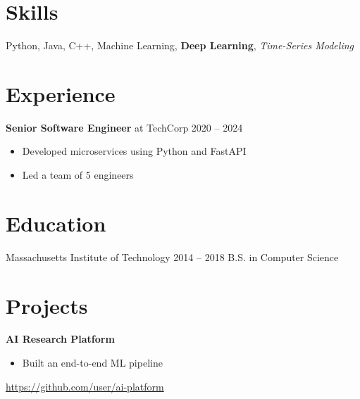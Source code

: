 \documentclass{article}
\begin{document}
\section{Skills}
Python, Java, C++, Machine Learning, \textbf{Deep Learning}, \textit{Time-Series Modeling}

\section{Experience}
\textbf{Senior Software Engineer} at TechCorp
2020 -- 2024
\begin{itemize}
    \item Developed microservices using Python and FastAPI
    \item Led a team of 5 engineers
\end{itemize}

\section{Education}
Massachusetts Institute of Technology
2014 -- 2018
B.S. in Computer Science

\section{Projects}
\textbf{AI Research Platform}
\begin{itemize}
    \item Built an end-to-end ML pipeline
\end{itemize}
\url{https://github.com/user/ai-platform}
\end{document}
